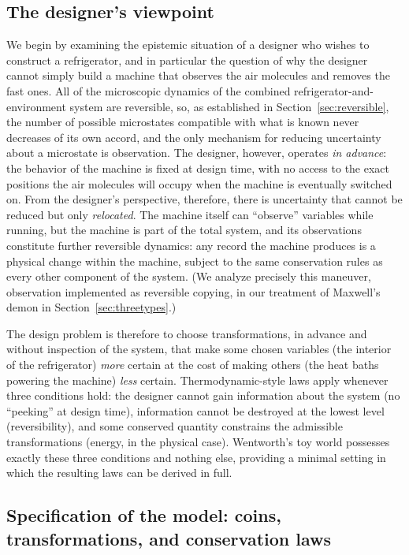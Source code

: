 \documentclass[11pt]{article}
\begin{document}
\subsection{The designer's viewpoint}
\label{sec:designer}

We begin by examining the epistemic situation of a designer who wishes to construct a refrigerator, and in particular the question of why the designer cannot simply build a machine that observes the air molecules and removes the fast ones. All of the microscopic dynamics of the combined refrigerator-and-environment system are reversible, so, as established in Section~\ref{sec:reversible}, the number of possible microstates compatible with what is known never decreases of its own accord, and the only mechanism for reducing uncertainty about a microstate is observation. The designer, however, operates \emph{in advance}: the behavior of the machine is fixed at design time, with no access to the exact positions the air molecules will occupy when the machine is eventually switched on. From the designer's perspective, therefore, there is uncertainty that cannot be reduced but only \emph{relocated}. The machine itself can ``observe'' variables while running, but the machine is part of the total system, and its observations constitute further reversible dynamics: any record the machine produces is a physical change within the machine, subject to the same conservation rules as every other component of the system. (We analyze precisely this maneuver, observation implemented as reversible copying, in our treatment of Maxwell's demon in Section~\ref{sec:threetypes}.)

The design problem is therefore to choose transformations, in advance and without inspection of the system, that make some chosen variables (the interior of the refrigerator) \emph{more} certain at the cost of making others (the heat baths powering the machine) \emph{less} certain. Thermodynamic-style laws apply whenever three conditions hold: the designer cannot gain information about the system (no ``peeking'' at design time), information cannot be destroyed at the lowest level (reversibility), and some conserved quantity constrains the admissible transformations (energy, in the physical case). Wentworth's toy world possesses exactly these three conditions and nothing else, providing a minimal setting in which the resulting laws can be derived in full.

\subsection{Specification of the model: coins, transformations, and conservation laws}
\label{sec:coinsetup}
\end{document}
